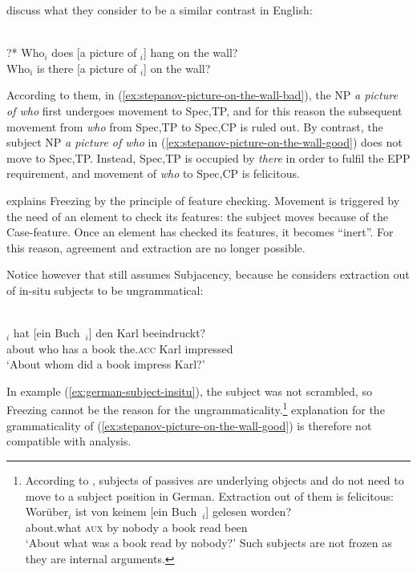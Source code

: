 \citet{Gallego.2007} discuss what they consider to be a similar contrast in English:

\eal\label{ex:stepanov-picture-on-the-wall}
\ex \citep[80]{Stepanov.2007}\\
?* Who$_i$ does [a picture of \trace{}$_i$] hang on the wall?  \label{ex:stepanov-picture-on-the-wall-bad}
\ex \citep[102]{Stepanov.2007}\\
Who$_i$ is there [a picture of \trace{}$_i$] on the wall?  \label{ex:stepanov-picture-on-the-wall-good}
\zl 

According to them, in (\ref{ex:stepanov-picture-on-the-wall-bad}), the NP \emph{a picture of who} first undergoes movement to Spec,TP, and for this reason the subsequent movement from \emph{who} from Spec,TP to Spec,CP is ruled out. By contrast, the subject NP \emph{a picture of who} in (\ref{ex:stepanov-picture-on-the-wall-good}) does not move to Spec,TP. Instead, Spec,TP is occupied by \emph{there} in order to fulfil the EPP requirement, and movement of \emph{who} to Spec,CP is felicitous. 

\citet[103]{Boeckx.2003} explains Freezing by the principle of feature checking. Movement is triggered by the need of an element to check its features: the subject moves because of the Case-feature. Once an element has checked its features, it becomes ``inert''. For this reason, agreement and extraction are no longer possible. 

Notice however that \citet{Mueller.G.1998} still assumes Subjacency, because he considers extraction out of in-situ subjects to be ungrammatical:

\ea \citep[30]{Mueller.G.1998}\\
$_i$ hat [ein Buch~\trace{}$_i$] den Karl beeindruckt?\\
{} about who has a book the\textsc{.acc} Karl impressed\\
\glt `About whom did a book impress Karl?'
\label{ex:german-subject-insitu}
\z\largerpage[2.25]

In example (\ref{ex:german-subject-insitu}), the subject was not scrambled, so Freezing cannot be the reason for the ungrammaticality.{\footnote{According to \citet{Mueller.G.1998}, subjects of passives  are underlying objects and do not need to move to a subject position in German. Extraction out of them is felicitous:
\ea \citep[124]{Mueller.G.1998}\\
    \gll Worüber$_i$ ist von keinem [ein Buch~\trace{}$_i$] gelesen worden?\\
    about.what \textsc{aux} by nobody a book read been\\
    \glt `About what was a book read by nobody?'
\z Such subjects are not frozen as they are internal arguments.}}
 explanation for the grammaticality of (\ref{ex:stepanov-picture-on-the-wall-good}) is therefore not compatible with  analysis.

